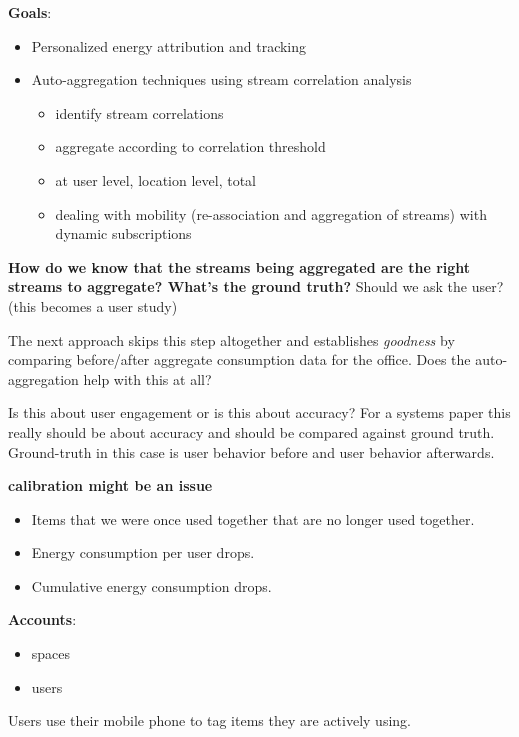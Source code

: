 {\bf Goals}:
\begin{itemize}
\item Personalized energy attribution and tracking
\item Auto-aggregation techniques using stream correlation analysis \\
	\begin{itemize}
	\item identify stream correlations
	\item aggregate according to correlation threshold
	\item at user level, location level, total
	\item dealing with mobility (re-association and aggregation of streams) with dynamic subscriptions
	\end{itemize}
\end{itemize}

{\bf How do we know that the streams being aggregated are the right streams to aggregate?  What's the ground truth?}
Should we ask the user? (this becomes a user study)

The next approach skips this step altogether and establishes \emph{goodness} by comparing before/after aggregate consumption
data for the office.  Does the auto-aggregation help with this at all?

Is this about user engagement or is this about accuracy?  For a systems paper this really should be about accuracy
and should be compared against ground truth.  Ground-truth in this case is user behavior before and user behavior afterwards.


{\bf calibration might be an issue}

\begin{itemize}
\item Items that we were once used together that are no longer used together.
\item Energy consumption per user drops.
\item Cumulative energy consumption drops.
\end{itemize}

{\bf Accounts}:
\begin{itemize}
\item spaces
\item users \\
\end{itemize}

Users use their mobile phone to tag items they are actively using. \\

